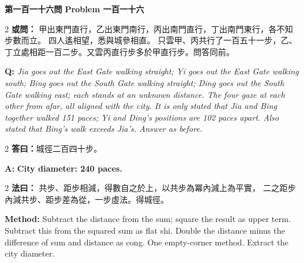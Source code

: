 \documentclass[11pt,a4paper]{article}
\newcommand{\wen}[1]{%
  \par\vspace{0.5em}%
  \noindent\textcolor{problemcolor}{\textbf{第#1問}}%
  \hfill\textcolor{problemcolor}{\textbf{Problem #1}}\par\nopagebreak%
  \vspace{0.3em}%
}
\newcommand{\owen}[1]{%
  \noindent\textcolor{problemcolor}{\textbf{或問：}}{\tradfont #1}\par\nopagebreak%
}
\newcommand{\oweneng}[1]{%
  \noindent\textcolor{engcolor}{\textbf{Q: }}{\itshape #1}\par\nopagebreak%
}
\newcommand{\fayue}[1]{%
  \noindent\textcolor{methodcolor}{\textbf{法曰：}}{\tradfont #1}\par\nopagebreak%
}
\newcommand{\fayueeng}[1]{%
  \noindent\textcolor{engcolor}{\textbf{Method: }}{#1}\par\nopagebreak%
}
\newcommand{\dayue}[1]{%
  \noindent\textcolor{anscolor}{\textbf{答曰：}}{\tradfont #1}\par\nopagebreak%
}
\newcommand{\dayueeng}[1]{%
  \noindent\textcolor{engcolor}{\textbf{A: }}{\bfseries #1}\par\nopagebreak%
}
\begin{document}
\vspace{0.5cm}

\wen{一百一十六}

\begin{paracol}{2}
\owen{%
甲出東門直行，乙出東門南行，丙出南門直行，丁出南門東行，各不知步數而立。
四人遙相望，悉與城參相直。
只雲甲、丙共行了一百五十一步，乙、丁立處相距一百二步。又雲丙直行步多於甲直行步。問答同前。}
\switchcolumn
\oweneng{%
Jia goes out the East Gate walking straight; Yi goes out the East Gate walking south; Bing goes out the South Gate walking straight; Ding goes out the South Gate walking east; each stands at an unknown distance. The four gaze at each other from afar, all aligned with the city. It is only stated that Jia and Bing together walked 151 paces; Yi and Ding's positions are 102 paces apart. Also stated that Bing's walk exceeds Jia's. Answer as before.}
\end{paracol}

\begin{paracol}{2}
\dayue{城徑二百四十步。}
\switchcolumn
\dayueeng{City diameter: 240 paces.}
\end{paracol}

\begin{paracol}{2}
\fayue{%
共步、距步相減，得數自之於上，以共步為冪內減上為平實，
二之距步內減共步、距步差為從，一步虛法。得城徑。}
\switchcolumn
\fayueeng{%
Subtract the distance from the sum; square the result as upper term. Subtract this from the squared sum as flat shi. Double the distance minus the difference of sum and distance as cong. One empty-corner method. Extract the city diameter.}
\end{paracol}
\end{document}
